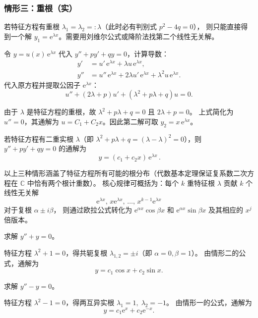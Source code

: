 \documentclass[lang=cn,11pt]{elegantbook}
\begin{document}
\subsubsection*{情形三：重根（实）}

若特征方程有重根 $\lambda_1=\lambda_2=: \lambda$（此时必有判别式 $p^2-4q=0$），
则只能直接得到一个解 $y_1=\mathrm{e}^{\lambda x}$。需要用刘维尔公式或降阶法找第二个线性无关解。

令 $y=u(x)\,\mathrm{e}^{\lambda x}$ 代入 $y''+py'+qy=0$，计算导数：
\begin{align*}
y'&=u'\,\mathrm{e}^{\lambda x}+\lambda u\,\mathrm{e}^{\lambda x},\\
y''&=u''\,\mathrm{e}^{\lambda x}+2\lambda u'\,\mathrm{e}^{\lambda x}+\lambda^{2}u\,\mathrm{e}^{\lambda x}.
\end{align*}
代入原方程并提取公因子 $\mathrm{e}^{\lambda x}$：
\[
u''+(2\lambda+p)u'+(\lambda^{2}+p\lambda+q)u=0.
\]

由于 $\lambda$ 是特征方程的重根，故 $\lambda^{2}+p\lambda+q=0$ 且 $2\lambda+p=0$。
上式简化为 $u''=0$，其通解为 $u=C_1+C_2 x$。因此第二解可取 $y_2=x\,\mathrm{e}^{\lambda x}$。

\begin{property}[重根情形的通解] \label{prop:char-repeated}
若特征方程有二重实根 $\lambda$（即 $\lambda^{2}+p\lambda+q=(\lambda-\lambda)^2=0$），则 $y''+py'+qy=0$ 的通解为
\[
\boxed{\,y=(c_1+c_2x)\,\mathrm{e}^{\lambda x}\,}.
\]
\end{property}

\begin{remark}[三种情形总结]
以上三种情形涵盖了特征方程所有可能的根分布（代数基本定理保证复系数二次方程在 $\mathbb C$ 中恰有两个根计重数）。
核心规律可概括为：每个 $k$ 重特征根 $\lambda$ 贡献 $k$ 个线性无关解
\[\mathrm{e}^{\lambda x},\,x\mathrm{e}^{\lambda x},\,\dots,\,x^{k-1}\mathrm{e}^{\lambda x}\]
对于复根 $\alpha\pm i\beta$，
则通过欧拉公式转化为 $\mathrm{e}^{\alpha x}\cos\beta x$ 和 $\mathrm{e}^{\alpha x}\sin\beta x$
及其相应的 $x^j$ 倍版本。
\end{remark}


\begin{exercise}
求解 $y''+y=0$。
\end{exercise}
\begin{solution}
特征方程 $\lambda^{2}+1=0$，得共轭复根 $\lambda_{1,2}=\pm i$（即 $\alpha=0,\beta=1$）。
由情形二的公式，通解为
\[
\boxed{y=c_1\cos x+c_2\sin x}.
\]
\end{solution}

\begin{exercise}
求解 $y''-y=0$。
\end{exercise}
\begin{solution}
特征方程 $\lambda^{2}-1=0$，得两互异实根 $\lambda_1=1,\;\lambda_2=-1$。
由情形一的公式，通解为
\[
\boxed{y=c_1\mathrm{e}^{x}+c_2\mathrm{e}^{-x}}.
\]
\end{solution}
\end{document}

